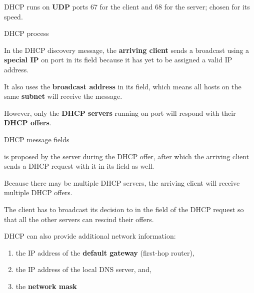 DHCP runs on \textbf{UDP} ports 67 for the client and 68 for the server; chosen for its speed.

\begin{defn}{DHCP process}
    \vspace{0.75em}
    \begin{enumerate}
    \end{enumerate}
\end{defn}

In the DHCP discovery message, the \textbf{arriving client} sends a broadcast using a \textbf{special IP} 
on port  in its  field because it has yet to be assigned a valid IP address.

It also uses the \textbf{broadcast address}  in its  field,
which means all hosts on the same \textbf{subnet} will receive the message.

However, only the \textbf{DHCP servers} running on port  will respond with their \textbf{DHCP offers}.

\begin{defn}{DHCP message fields}
    \vspace{0.75em}
    \begin{enumerate}
    \end{enumerate}
\end{defn}

 is proposed by the server during the DHCP offer, after which the arriving client
sends a DHCP request with it in its  field as well.

Because there may be multiple DHCP servers, the arriving client will receive multiple DHCP offers.

The client has to broadcast its decision to  in the  field of the DHCP request
so that all the other servers can rescind their offers.

DHCP can also provide additional network information:
\begin{enumerate}
    \item the IP address of the \textbf{default gateway} (first-hop router),
    \item the IP address of the local DNS server, and,
    \item the \textbf{network mask} 
\end{enumerate}

